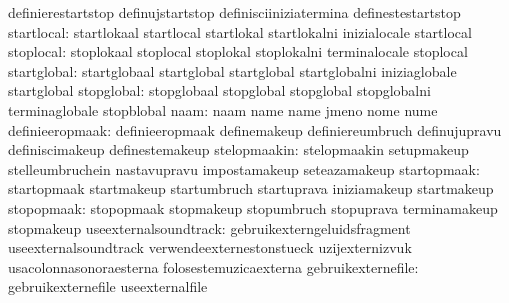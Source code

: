                                   definierestartstop               definujstartstop
                                  definisciiniziatermina           definestestartstop
                      startlocal: startlokaal                      startlocal
                                  startlokal                       startlokalni
                                  inizialocale                     startlocal
                       stoplocal: stoplokaal                       stoplocal
                                  stoplokal                        stoplokalni
                                  terminalocale                    stoplocal
                     startglobal: startglobaal                     startglobal
                                  startglobal                      startglobalni
                                  iniziaglobale                    startglobal
                      stopglobal: stopglobaal                      stopglobal
                                  stopglobal                       stopglobalni
                                  terminaglobale                   stopblobal
                            naam: naam                             name
                                  name                             jmeno
                                  nome                             nume
                 definieeropmaak: definieeropmaak                  definemakeup
                                  definiereumbruch                 definujupravu
                                  definiscimakeup                  definestemakeup %
                    stelopmaakin: stelopmaakin                     setupmakeup
                                  stelleumbruchein                 nastavupravu
                                  impostamakeup                    seteazamakeup
                     startopmaak: startopmaak                      startmakeup
                                  startumbruch                     startuprava
                                  iniziamakeup                     startmakeup
                      stopopmaak: stopopmaak                       stopmakeup
                                  stopumbruch                      stopuprava
                                  terminamakeup                    stopmakeup
           useexternalsoundtrack: gebruikexterngeluidsfragment     useexternalsoundtrack
                                  verwendeexternestonstueck        uzijexternizvuk
                                  usacolonnasonoraesterna          folosestemuzicaexterna
              gebruikexternefile: gebruikexternefile               useexternalfile
